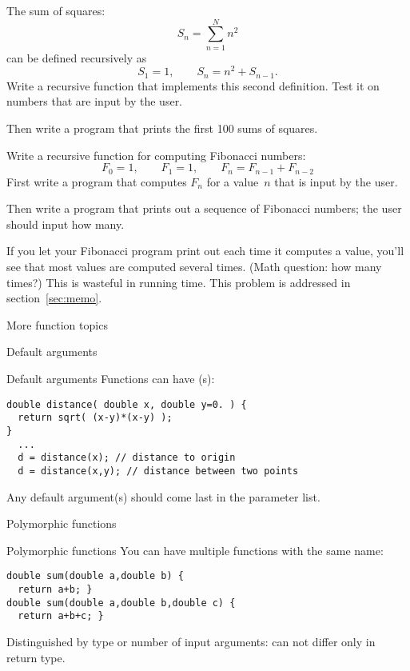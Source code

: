\begin{exercise}
  \label{ex:recur-sum}
  The sum of squares:
  \[ S_n = \sum_{n=1}^N n^2 \]
  can be defined recursively as
  \[ S_1=1,\qquad S_n = n^2 + S_{n-1}. \]
  Write a recursive function that implements this second definition.
  Test it on numbers that are input by the user.

  Then write a program that prints the first 100 sums of squares.
\end{exercise}

\begin{exercise}
  \label{ex:recur-fib}
  Write a recursive function for computing Fibonacci numbers:
  \[ F_0=1,\qquad F_1=1,\qquad F_{n}=F_{n-1}+F_{n-2} \]
  First write a program that computes $F_n$ for a value~$n$ that is
  input by the user.

  Then write a program that prints out a sequence of Fibonacci
  numbers; the user should input how many.
\end{exercise}

If you let your Fibonacci program print out each time it computes a
value, you'll see that most values are computed several times. (Math
question: how many times?) This is wasteful in running time. This
problem is addressed in section~\ref{sec:memo}.

 {More function topics}

 {Default arguments}

\begin{block}{Default arguments}
  \label{sl:def-arg}
  Functions can have (s):
\begin{verbatim}
double distance( double x, double y=0. ) {
  return sqrt( (x-y)*(x-y) );
}
  ...
  d = distance(x); // distance to origin
  d = distance(x,y); // distance between two points
\end{verbatim}
Any default argument(s) should come last in the parameter list.
\end{block}

 {Polymorphic functions}
\label{sec:polyfunc}

\begin{block}{Polymorphic functions}
  \label{sl:func-poly}
  You can have multiple functions with the same name:
\begin{verbatim}
double sum(double a,double b) {
  return a+b; }
double sum(double a,double b,double c) {
  return a+b+c; }
\end{verbatim}
Distinguished by type or number of input arguments: can not differ only in return type.
\end{block}

